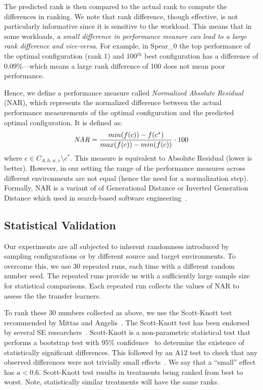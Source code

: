 \documentclass[10pt,journal,compsoc]{IEEEtran}
\begin{document}
\noindent The predicted rank is then compared to the actual rank to compute the differences in ranking. We note that rank difference, though effective, is not particularly informative since it is sensitive to the workload. This means that in some workloads, \textit{a small difference in performance measure can lead to a large rank difference and vice-versa}. For example, in {\sc Spear\_0} the top performance of the optimal configuration (rank 1) and 100$^{th}$ best configuration has a difference of 0.09\%---which means a large rank difference of 100 does not mean poor performance. 

Hence, we define a performance measure called \textit{Normalized Absolute Residual} (NAR), which represents the normalized difference between the actual performance measurements of the optimal configuration and the predicted optimal configuration. It is defined as: 
\begin{equation}
\label{eq:nar}
{ \tiny
    \mathit{NAR} = \frac{min(f(c)) - f(c^{*})}{max(f(c)) - min(f(c))} \cdot 100
}
\end{equation}
where $c \in C_{A,h,w,v} \setminus c^*$. This measure is equivalent to Absolute Residual (lower is better). However, in our setting the range of the performance measures across different environments are not equal (hence the need for a normalization step). Formally, NAR is a variant of of Generational Distance or Inverted Generation Distance which used in search-based software engineering~\cite{wang2016practical, chen2018sampling, deb2002fast}.

\subsection{Statistical Validation}
\label{sect:stats}

Our experiments are all subjected to inherent randomness introduced by sampling configurations or by different source and target environments. To overcome this, we use 30 repeated runs, each time with a different random number seed. The repeated runs provide us with a sufficiently large sample size for statistical comparisons. Each repeated run collects the values of NAR to assess the the transfer learners.

To rank these 30 numbers collected as above, we use the Scott-Knott test 
recommended by Mittas and Angelis~\cite{mittas13}. The Scott-Knott test has been endorsed by several SE researchers~\cite{leech2002call, poulding10, arcuri11, shepperd12a, kampenes07, Kocaguneli2013:ep}. Scott-Knott is a non-parametric statistical test that performs a bootstrap test with 95\% confidence~\cite{efron93} to determine the existence of statistically significant differences. This followed by an A12 test to check that any observed differences were not trivially small effects~\cite{Vargha00}. We say that a ``small'' effect has $a <0.6$. 
Scott-Knott test results in treatments being ranked from best to worst. Note, statistically similar treatments will have the same ranks.
\end{document}
